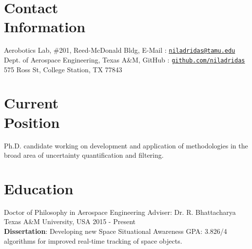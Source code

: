 \documentclass[margin,line]{resume}
\begin{document}
\begin{resume}

    \section{\mysidestyle Contact\\Information}

    Aerobotics Lab, \#201, Reed-McDonald Bldg,   		\hfill E-Mail : \href{mailto:niladridas@tamu.edu}{\texttt{niladridas@tamu.edu}} \\
	Dept. of Aerospace Engineering, Texas A\&M,                   \hfill \hfill GitHub : \href{https://github.com/niladridas}{\texttt{github.com/niladridas}} \\
	 575 Ross St, College Station, TX 77843

    \section{\mysidestyle Current\\Position}
    Ph.D. candidate working on development and application of methodologies in the broad area of uncertainty quantification and filtering.


    \section{\mysidestyle Education}
    Doctor of Philosophy in Aerospace Engineering \hfill Adviser: Dr. R. Bhattacharya\\
    Texas A\&M University, USA \hfill 2015 - Present \\
    \textbf{Dissertation}: Developing new Space Situational Awareness \hfill GPA: 3.826/4\\algorithms for improved real-time tracking of space objects.


\end{resume}
\end{document}
